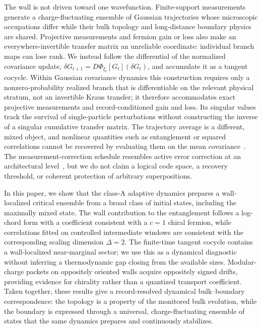 \documentclass[aps,prb,twocolumn,superscriptaddress,longbibliography]{revtex4-2}
\theoremstyle{plain}
\theoremstyle{definition}
\theoremstyle{remark}
\begin{document}
The wall is not driven toward one wavefunction.  Finite-support measurements generate a charge-fluctuating ensemble of Gaussian trajectories whose microscopic occupations differ while their bulk topology and long-distance boundary physics are shared.  Projective measurements and fermion gain or loss also make an everywhere-invertible transfer matrix an unreliable coordinate: individual branch maps can lose rank.  We instead follow the differential of the normalized covariance update, $\delta G_{t+1}=D\Phi_{\xi_t}[G_t](\delta G_t)$, and accumulate it as a tangent cocycle.  Within Gaussian covariance dynamics this construction requires only a nonzero-probability realized branch that is differentiable on the relevant physical stratum, not an invertible Kraus transfer; it therefore accommodates exact projective measurements and record-conditioned gain and loss.  Its singular values track the survival of single-particle perturbations without constructing the inverse of a singular cumulative transfer matrix.  The trajectory average is a different, mixed object, and nonlinear quantities such as entanglement or squared correlations cannot be recovered by evaluating them on the mean covariance~\cite{ChoiBaoQiAltman2020,GullansHuse2020,Soares2025}.  The measurement-correction schedule resembles active error correction at an architectural level~\cite{HastingsHaah2021,AasenHaahLiMong2023}, but we do not claim a logical code space, a recovery threshold, or coherent protection of arbitrary superpositions.

In this paper, we show that the class-A adaptive dynamics prepares a wall-localized critical ensemble from a broad class of initial states, including the maximally mixed state.  The wall contribution to the entanglement follows a log-chord form with a coefficient consistent with a $c=1$ chiral fermion, while correlations fitted on controlled intermediate windows are consistent with the corresponding scaling dimension $\Delta=2$.  The finite-time tangent cocycle contains a wall-localized near-marginal sector; we use this as a dynamical diagnostic without inferring a thermodynamic gap closing from the available sizes.  Modular-charge packets on oppositely oriented walls acquire oppositely signed drifts, providing evidence for chirality rather than a quantized transport coefficient.  Taken together, these results give a record-resolved dynamical bulk--boundary correspondence: the topology is a property of the monitored bulk evolution, while the boundary is expressed through a universal, charge-fluctuating ensemble of states that the same dynamics prepares and continuously stabilizes.



\end{document}
